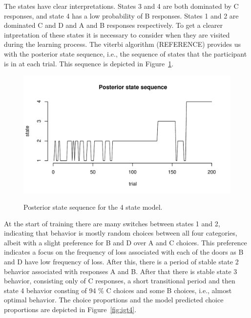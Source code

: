 \documentclass[a4paper,12pt,man]{apa} %
\begin{document}
The states have clear interpretations. States 3 and 4 are both
dominated by C responses, and state 4 has a low probability of B
responses. States 1 and 2 are dominated C and D and A and B responses 
respectively. To get a clearer intpretation of these states it is
necessary to consider when they are visited during the learning
process. The viterbi algorithm (REFERENCE) provides us with the
posterior state sequence, i.e., the sequence of states that the
participant is in at each trial. This sequence is depicted in
Figure~\ref{fig:post4}. 

\begin{figure}
\begin{center}
	\includegraphics[width=\textwidth]{graphs/post4.pdf}
	\label{fig:post4}
	\caption{Posterior state sequence for the 4 state model.}
\end{center}
\end{figure}

At the start of training there are many switches between states 1 and 
2, indicating that behavior is mostly random choices between all four 
categories, albeit with a slight preference for B and D over A and C
choices. This preference indicates a focus on the frequency of loss
associated with each of the doors as B and D have low frequency of
loss. After this, there is a period of stable state 2 behavior
associated with responses A and B. After that there is stable state 3 
behavior, consisting only of C responses, a short transitional period 
and then state 4 behavior consting of 94 \% C choices and some B
choices, i.e., almost optimal behavior. The choice proportions and the
model predicted choice proportions are depicted in
Figure~\ref{fig:igt4}. 
\end{document}

